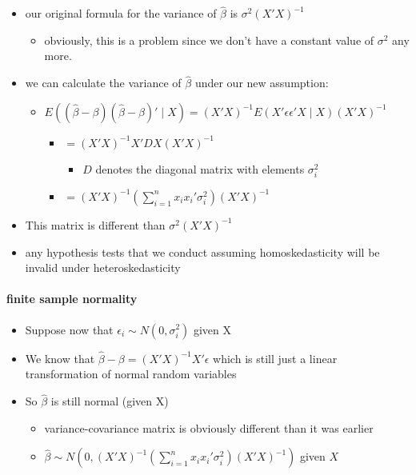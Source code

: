 \begin{itemize}
\item our original formula for the variance of $\hat\beta$ is
        $\sigma^2 (X'X)^{-1}$
\begin{itemize}
\item obviously, this is a problem since we don't have a constant
          value of $\sigma^2$ any more.
\end{itemize}
\item we can calculate the variance of $\hat\beta$ under our new
        assumption:
\begin{itemize}
\item $E((\hat\beta - \beta)(\hat\beta - \beta)' \mid X) =
          (X'X)^{-1} E(X'\epsilon \epsilon'X \mid X) (X'X)^{-1}$
\begin{itemize}
\item $= (X'X)^{-1} X'DX (X'X)^{-1}$
\begin{itemize}
\item $D$ denotes the diagonal matrix with elements $\sigma_i^2$
\end{itemize}
\item $= (X'X)^{-1} (\sum_{i=1}^n x_i x_i' \sigma_i^2)(X'X)^{-1}$
\end{itemize}
\end{itemize}
\item This matrix is different than $\sigma^2(X'X)^{-1}$
\item any hypothesis tests that we conduct assuming homoskedasticity
        will be invalid under heteroskedasticity
\end{itemize}
\paragraph{finite sample normality}
\label{sec-1-1-5}

\begin{itemize}
\item Suppose now that $\epsilon_i \sim N(0, \sigma_i^2)$ given X
\item We know that $\hat\beta - \beta = (X'X)^{-1}X'\epsilon$ which
        is still just a linear transformation of normal random variables
\item So $\hat\beta$ is still normal (given X)
\begin{itemize}
\item variance-covariance matrix is obviously different than it was
          earlier
\item $\hat \beta \sim N\left(0, (X'X)^{-1} \left(\sum_{i=1}^n x_i x_i' \sigma_i^2 \right)
          (X'X)^{-1}\right)$ given $X$
\end{itemize}
\end{itemize}
